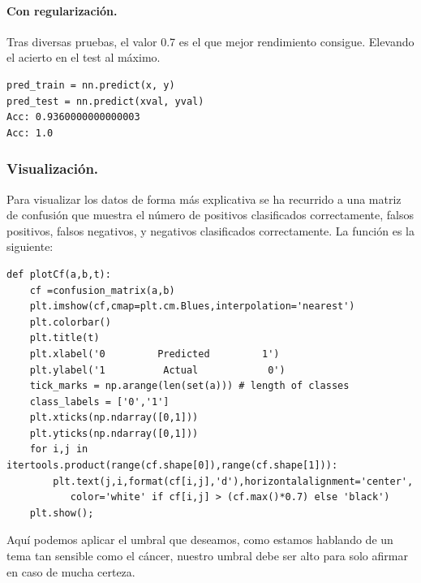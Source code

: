 \documentclass[a4paper,10pt]{article}
\begin{document}
\paragraph{Con regularización.}
Tras diversas pruebas, el valor 0.7 es el que mejor rendimiento consigue. Elevando el acierto en el test al máximo.
\begin{lstlisting}
pred_train = nn.predict(x, y)
pred_test = nn.predict(xval, yval)
Acc: 0.9360000000000003
Acc: 1.0
\end{lstlisting}
\subsubsection{Visualización.}
Para visualizar los datos de forma más explicativa se ha recurrido a una matriz de confusión que muestra el número de positivos clasificados correctamente, falsos positivos, falsos negativos, y  negativos clasificados correctamente. La función es la siguiente:
\begin{lstlisting}
def plotCf(a,b,t):
    cf =confusion_matrix(a,b)
    plt.imshow(cf,cmap=plt.cm.Blues,interpolation='nearest')
    plt.colorbar()
    plt.title(t)
    plt.xlabel('0         Predicted         1')
    plt.ylabel('1          Actual            0')
    tick_marks = np.arange(len(set(a))) # length of classes
    class_labels = ['0','1']
    plt.xticks(np.ndarray([0,1]))
    plt.yticks(np.ndarray([0,1]))
    for i,j in itertools.product(range(cf.shape[0]),range(cf.shape[1])):
        plt.text(j,i,format(cf[i,j],'d'),horizontalalignment='center',
           color='white' if cf[i,j] > (cf.max()*0.7) else 'black')
    plt.show();
\end{lstlisting}
Aquí podemos aplicar el umbral que deseamos, como estamos hablando de un tema tan sensible como el cáncer, nuestro umbral debe ser alto para solo afirmar en caso de mucha certeza.
\end{document}
